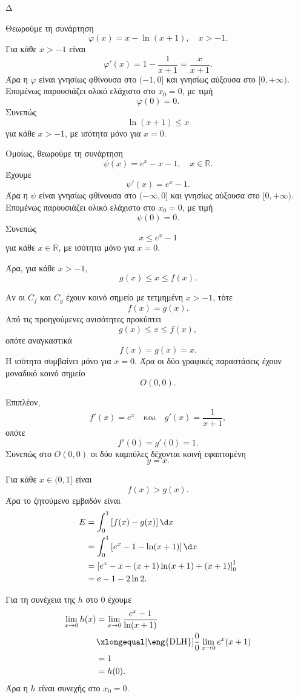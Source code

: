 \begin{thema}{Δ}
\begin{erwthma}
\item Θεωρούμε τη συνάρτηση
\[
\varphi(x)=x-\ln(x+1),\quad x>-1.
\]
Για κάθε $x>-1$ είναι
\[
\varphi'(x)=1-\frac{1}{x+1}=\frac{x}{x+1}.
\]
Άρα η $\varphi$ είναι γνησίως φθίνουσα στο $(-1,0]$ και γνησίως αύξουσα στο $[0,+\infty)$. Επομένως παρουσιάζει ολικό ελάχιστο στο $x_0=0$, με τιμή
\[
\varphi(0)=0.
\]
Συνεπώς
\[
{\ln(x+1)\leq x}
\]
για κάθε $x>-1$, με ισότητα μόνο για $x=0$.

Ομοίως, θεωρούμε τη συνάρτηση
\[
\psi(x)=e^x-x-1,\quad x\in\mathbb{R}.
\]
Έχουμε
\[
\psi'(x)=e^x-1.
\]
Άρα η $\psi$ είναι γνησίως φθίνουσα στο $(-\infty,0]$ και γνησίως αύξουσα στο $[0,+\infty)$. Επομένως παρουσιάζει ολικό ελάχιστο στο $x_0=0$, με τιμή
\[
\psi(0)=0.
\]
Συνεπώς
\[
{x\leq e^x-1}
\]
για κάθε $x\in\mathbb{R}$, με ισότητα μόνο για $x=0$.

Άρα, για κάθε $x>-1$,
\[
{g(x)\leq x\leq f(x)}.
\]

Αν οι $C_f$ και $C_g$ έχουν κοινό σημείο με τετμημένη $x>-1$, τότε
\[
f(x)=g(x).
\]
Από τις προηγούμενες ανισότητες προκύπτει
\[
g(x)\leq x\leq f(x),
\]
οπότε αναγκαστικά
\[
f(x)=g(x)=x.
\]
Η ισότητα συμβαίνει μόνο για $x=0$. Άρα οι δύο γραφικές παραστάσεις έχουν μοναδικό κοινό σημείο
\[
{O(0,0)}.
\]

Επιπλέον,
\[
f'(x)=e^x
\quad\text{και}\quad
g'(x)=\frac{1}{x+1},
\]
οπότε
\[
f'(0)=g'(0)=1.
\]
Συνεπώς στο $O(0,0)$ οι δύο καμπύλες δέχονται κοινή εφαπτομένη
\[
{y=x}.
\]

\item Για κάθε $x\in(0,1]$ είναι
\[
f(x)>g(x).
\]
Άρα το ζητούμενο εμβαδόν είναι
\begin{align*}
E
&=\int_0^1\left[f(x)-g(x)\right]\d x\\
&=\int_0^1\left[e^x-1-\ln(x+1)\right]\d x\\
&=\left[
e^x-x-(x+1)\ln(x+1)+(x+1)
\right]_0^1\\
&={e-1-2\ln2}.
\end{align*}

\item Για τη συνέχεια της $h$ στο $0$ έχουμε
\begin{align*}
\lim_{x\to0}h(x)
&=\lim_{x\to0}\frac{e^x-1}{\ln(x+1)}\\
&\xlongequal[\text{\eng{DLH}}]{\frac{0}{0}}
\lim_{x\to0}e^x(x+1)\\
&=1\\
&=h(0).
\end{align*}
Άρα η $h$ είναι συνεχής στο $x_0=0$.


\end{erwthma}
\end{thema}
